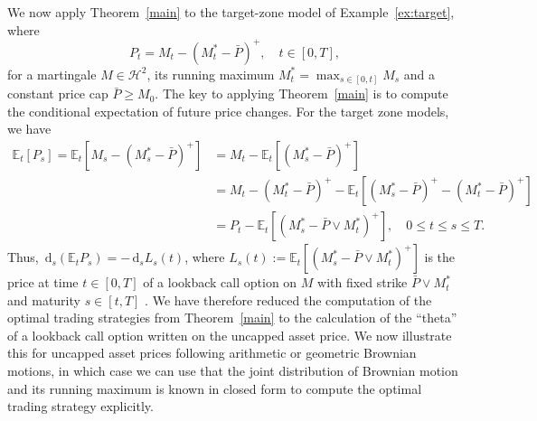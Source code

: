 \documentclass[11pt]{article}
\theoremstyle{definition}
\theoremstyle{remark}
\newtheorem{rem}[thm]{Remark}
\newcommand{\E}{\mathbb{E}} %
\newcommand{\de}{\,\mathrm{d}}
\begin{document}
We now apply Theorem~\ref{main} to the target-zone model of Example~\ref{ex:target}, where
$$
P_t=M_t -(M^*_t-\bar{P})^+, \quad t \in [0,T],
$$
for a martingale $M\in\mathcal{H}^2$, its running maximum $M^*_t=\max_{s \in [0,t]}M_s$ and a constant price cap $\bar{P} \geq M_0$. The key to applying Theorem~\ref{main} is to compute the conditional expectation of future price changes. For the target zone models, we have
\begin{align*}
\E_t[P_s] = \E_t\left[M_s-(M^*_s-\bar{P})^+\right] &= M_t-\E_t\left[(M^*_s-\bar{P})^+\right]\\
& =M_t-(M^*_t-\bar{P})^+ - \E_t\left[(M^*_s-\bar{P})^+ - (M^*_t-\bar{P})^+\right]\\
&=P_t - \E_t\left[(M^*_s-\bar{P}\vee M^*_t)^+\right], \quad 0 \leq t \leq s \leq T.
\end{align*}
Thus, $\de_s(\E_t P_s) = -\de_s L_s(t)$, where $L_s(t):=\E_t[(M^*_s-\bar{P}\vee M^*_t)^+]$ is the price at time $t \in [0,T]$ of a lookback call option on $M$ with fixed strike $\bar{P}\vee M^*_t$ and maturity $s \in [t,T]$ . We have therefore reduced the computation of the optimal trading strategies from Theorem~\ref{main} to the calculation of the ``theta'' of a lookback call option written on the uncapped asset price. We now illustrate this for uncapped asset prices following arithmetic or geometric Brownian motions, in which case we can use that the joint distribution of Brownian motion and its running maximum is known in closed form to compute the optimal trading strategy explicitly.

\end{document}
